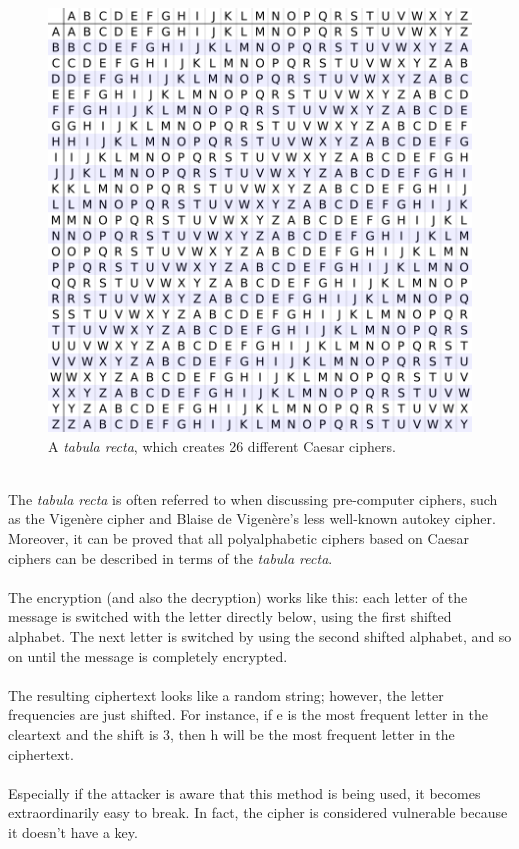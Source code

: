 \documentclass[Lau,binding=0.6cm,oneside]{sapthesis}
\begin{document}
\begin{figure}[H]
\includegraphics[scale=0.4]{tabula_recta}
\centering
\caption{A \textit{tabula recta}, which creates 26 different Caesar ciphers.}
\centering
\end{figure}
\ \\
The \textit{tabula recta} is often referred to when discussing pre-computer ciphers, such as the Vigenère cipher and Blaise de Vigenère's less well-known autokey cipher. Moreover, it can be proved that all polyalphabetic ciphers based on Caesar ciphers can be described in terms of the \textit{tabula recta}.\\\\
The encryption (and also the decryption) works like this: each letter of the message is switched with the letter directly below, using the first shifted alphabet. The next letter is switched by using the second shifted alphabet, and so on until the message is completely encrypted.\\\\
The resulting ciphertext looks like a random string; however, the letter frequencies are just shifted. For instance, if \textsf{e} is the most frequent letter in the cleartext and the shift is 3, then \textsf{h} will be the most frequent letter in the ciphertext.\\\\
Especially if the attacker is aware that this method is being used, it becomes extraordinarily easy to break. In fact, the cipher is considered vulnerable because it doesn't have a key.
\end{document}
